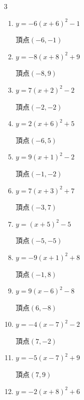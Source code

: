 \begin{multicols}{3}
\begin{enumerate}
  \item $\displaystyle y=-6\left( x+6\right)^{2}-1$

        $\displaystyle 頂点\left( -6 , -1 \right)$

  \item $\displaystyle y=-8\left( x+8\right)^{2}+9$

        $\displaystyle 頂点\left( -8 , 9 \right)$

  \item $\displaystyle y=7\left( x+2\right)^{2}-2$

        $\displaystyle 頂点\left( -2 , -2 \right)$

  \item $\displaystyle y=2\left( x+6\right)^{2}+5$

        $\displaystyle 頂点\left( -6 , 5 \right)$

  \item $\displaystyle y=9\left( x+1\right)^{2}-2$

        $\displaystyle 頂点\left( -1 , -2 \right)$

  \item $\displaystyle y=7\left( x+3\right)^{2}+7$

        $\displaystyle 頂点\left( -3 , 7 \right)$

  \item $\displaystyle y=\left( x+5\right)^{2}-5$

        $\displaystyle 頂点\left( -5 , -5 \right)$

  \item $\displaystyle y=-9\left( x+1\right)^{2}+8$

        $\displaystyle 頂点\left( -1 , 8 \right)$

  \item $\displaystyle y=9\left( x-6\right)^{2}-8$

        $\displaystyle 頂点\left( 6 , -8 \right)$

  \item $\displaystyle y=-4\left( x-7\right)^{2}-2$

        $\displaystyle 頂点\left( 7 , -2 \right)$

  \item $\displaystyle y=-5\left( x-7\right)^{2}+9$

        $\displaystyle 頂点\left( 7 , 9 \right)$

\columnbreak %

  \item $\displaystyle y=-2\left( x+8\right)^{2}+6$


\end{enumerate}
\end{multicols}
